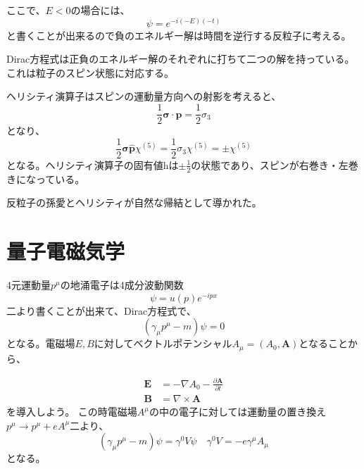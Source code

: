 \documentclass[titlepage]{ltjsarticle}
\begin{document}
ここで、\(E<0\)の場合には、
\begin{equation}
  \psi = e^{-i(-E)(-t)}
\end{equation}
と書くことが出来るので負のエネルギー解は時間を逆行する反粒子に考える。


Dirac方程式は正負のエネルギー解のそれぞれに打ちて二つの解を持っている。
これは粒子のスピン状態に対応する。

ヘリシティ演算子はスピンの運動量方向への射影を考えると、
\begin{equation}
  \frac{1}{2} \bm{\sigma} \cdot \bm{p} = \frac{1}{2}\sigma_3
\end{equation}
となり、
\begin{equation}
  \frac{1}{2}\bm{\sigma} \hat{\bm{p}} \chi^{(5)} = \frac{1}{2}\sigma_3 \chi^{(5)} = \pm \chi^{(5)}
\end{equation}
となる。ヘリシティ演算子の固有値hは\(\pm \frac{1}{2}\)の状態であり、スピンが右巻き・左巻きになっている。

反粒子の孫愛とヘリシティが自然な帰結として導かれた。




\section{量子電磁気学}
4元運動量\(p^\mu\)の地涌電子は4成分波動関数
\begin{equation}
  \psi = u(p) e^{-ipx}
\end{equation}
二より書くことが出来て、Dirac方程式で、
\begin{equation}
  (\gamma_\mu p^\mu - m)\psi = 0
\end{equation}
となる。電磁場\(E,B\)に対してベクトルポテンシャル\(A_\mu=(A_0,\bm{A})\)となることから、

\begin{align}
  \bm{E} & = - \nabla A_0 - \frac{\partial \bm{A}}{\partial t} \\
  \bm{B} & = \nabla \times \bm{A}
\end{align}
を導入しよう。
この時電磁場\(A^\mu\)の中の電子に対しては運動量の置き換え\(p^\mu\to p^\mu+eA^\mu\)二より、
\begin{equation}
  (\gamma_\mu p^\mu -m )\psi = \gamma^0V \psi  \quad \gamma^0 V = -e \gamma^\mu A_\mu
\end{equation}
となる。
\end{document}
